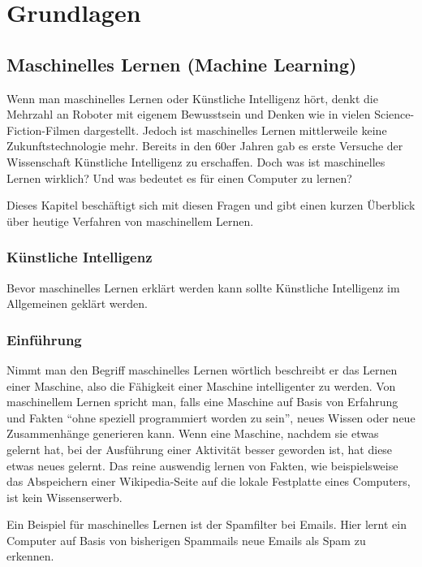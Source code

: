 \chapter{Grundlagen}

\section{Maschinelles Lernen (Machine Learning)}

    Wenn man maschinelles Lernen oder Künstliche Intelligenz hört, denkt die Mehrzahl an Roboter mit eigenem Bewusstsein und Denken wie in vielen Science-Fiction-Filmen dargestellt.
    Jedoch ist maschinelles Lernen mittlerweile keine Zukunftstechnologie mehr.
    Bereits in den 60er Jahren gab es erste Versuche der Wissenschaft Künstliche Intelligenz zu erschaffen.
    Doch was ist maschinelles Lernen wirklich? Und was bedeutet es für einen Computer zu lernen?
    \newline

    \noindent
    Dieses Kapitel beschäftigt sich mit diesen Fragen und gibt einen kurzen Überblick über heutige Verfahren von maschinellem Lernen.

    \subsection{Künstliche Intelligenz}
    Bevor maschinelles Lernen erklärt werden kann sollte Künstliche Intelligenz im Allgemeinen geklärt werden.


    \subsection{Einführung}
    Nimmt man den Begriff maschinelles Lernen wörtlich beschreibt er das Lernen einer Maschine, also die Fähigkeit einer Maschine intelligenter zu werden.
    Von maschinellem Lernen spricht man, falls eine Maschine auf Basis von Erfahrung und Fakten "`ohne speziell programmiert worden zu sein"'\cite[20]{HandsOnML}, neues Wissen oder neue Zusammenhänge generieren kann.
    Wenn eine Maschine, nachdem sie etwas gelernt hat, bei der Ausführung einer Aktivität besser geworden ist, hat diese etwas neues gelernt\cite[20]{HandsOnML}.
    Das reine auswendig lernen von Fakten, wie beispielsweise das Abspeichern einer Wikipedia-Seite auf die lokale Festplatte eines Computers, ist kein Wissenserwerb.
    \newline

    \noindent
    Ein Beispiel für maschinelles Lernen ist der Spamfilter bei Emails.
    Hier lernt ein Computer auf Basis von bisherigen Spammails neue Emails als Spam zu erkennen.
    \newline


